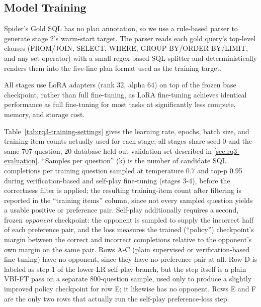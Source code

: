 \subsection{Model Training}
\label{sec:rq3-training}

Spider's Gold SQL has no plan annotation, so we use a rule-based parser to generate stage 2's warm-start target. The parser reads each gold query's top-level clauses (FROM/JOIN, SELECT, WHERE, GROUP BY/ORDER BY/LIMIT, and any set operator) with a small regex-based SQL splitter and deterministically renders them into the five-line plan format used as the training target.

All stages use LoRA adapters (rank 32, alpha 64) on top of the frozen base checkpoint, rather than full fine-tuning, as LoRA fine-tuning achieves identical performance as full fine-tuning for most tasks at significantly less compute, memory, and storage cost.

Table~\ref{tab:rq3-training-settings} gives the learning rate, epochs, batch size, and training-item counts actually used for each stage; all stages share seed 0 and the same 707-question, 20-database held-out validation set described in \ref{sec:rq3-evaluation}. ``Samples per question'' (k) is the number of candidate SQL completions per training question sampled at temperature 0.7 and top-p 0.95 during verification-based and self-play fine-tuning (stages 3-4), before the correctness filter is applied; the resulting training-item count after filtering is reported in the ``training items'' column, since not every sampled question yields a usable positive or preference pair. Self-play additionally requires a second, frozen \emph{opponent} checkpoint: the opponent is sampled to supply the incorrect half of each preference pair, and the loss measures the trained (``policy'') checkpoint's margin between the correct and incorrect completions relative to the opponent's own margin on the same pair. Rows A-C (plain supervised or verification-based fine-tuning) have no opponent, since they have no preference pair at all. Row D is labeled as step 1 of the lower-LR self-play branch, but the step itself is a plain VBI-FT pass on a separate 800-question sample, used only to produce a slightly improved policy checkpoint for row E; it likewise has no opponent. Rows E and F are the only two rows that actually run the self-play preference-loss step.

